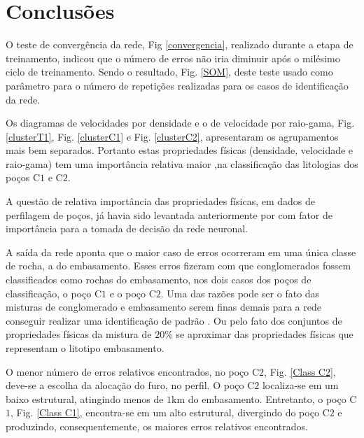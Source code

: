 \chapter{Conclusões}

O teste de convergência da rede, Fig \ref{convergencia}, realizado durante a etapa de treinamento, indicou que o número de erros não iria diminuir após o milésimo ciclo de treinamento. Sendo o resultado, Fig. \ref{SOM}, deste teste usado como parâmetro para o número de repetições realizadas para os casos de identificação da rede. 

Os diagramas de velocidades por densidade e o de velocidade por raio-gama, Fig. \ref{clusterT1}, Fig. \ref{clusterC1} e Fig. \ref{clusterC2}, apresentaram os agrupamentos mais bem separados. Portanto estas propriedades físicas (densidade, velocidade e raio-gama) tem uma importância relativa maior ,na classificação das litologias dos poços C$1$ e C$2$. 

A questão de relativa importância das propriedades físicas, em dados de perfilagem de poços, já havia sido levantada anteriormente por \citet{Gloaguen2017} com fator de importância para a tomada de decisão da rede neuronal.

A saída da rede aponta que o maior caso de erros ocorreram em uma única classe de rocha, a do embasamento. Esses erros fizeram com que conglomerados fossem classificados como rochas do embasamento, nos dois casos dos poços de classificação, o poço C$1$ e o poço C$2$.  Uma das razões pode ser o fato das misturas de conglomerado e embasamento serem finas demais para a rede conseguir realizar uma identificação de padrão \citep{Chakravarthy1999}. Ou pelo fato dos conjuntos de propriedades físicas da mistura de $20\%$ se aproximar das propriedades físicas que representam o litotipo embasamento. 

O menor número de erros relativos encontrados, no poço C$2$, Fig. \ref{Class C2}, deve-se a escolha da alocação do furo, no perfil. O poço C$2$ localiza-se em um baixo estrutural, atingindo menos de $1$km do embasamento. Entretanto, o poço C$1$, Fig. \ref{Class C1}, encontra-se em um alto estrutural, divergindo do poço C$2$ e produzindo, consequentemente, os maiores erros relativos encontrados.    
